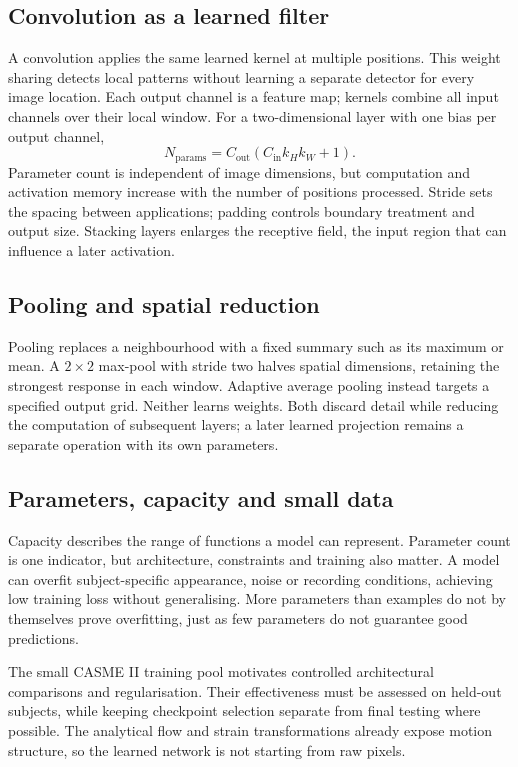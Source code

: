 \subsection{Convolution as a learned filter}
\label{sec:convolution}

A convolution applies the same learned kernel at multiple positions. This weight sharing detects local patterns without learning a separate detector for every image location. Each output channel is a feature map; kernels combine all input channels over their local window. For a two-dimensional layer with one bias per output channel,
\[
    N_{\mathrm{params}}=C_{\mathrm{out}}
       (C_{\mathrm{in}}k_Hk_W+1).
\]
Parameter count is independent of image dimensions, but computation and activation memory increase with the number of positions processed. Stride sets the spacing between applications; padding controls boundary treatment and output size. Stacking layers enlarges the receptive field, the input region that can influence a later activation.

\subsection{Pooling and spatial reduction}
\label{sec:pooling}

Pooling replaces a neighbourhood with a fixed summary such as its maximum or mean. A $2\times2$ max-pool with stride two halves spatial dimensions, retaining the strongest response in each window. Adaptive average pooling instead targets a specified output grid. Neither learns weights. Both discard detail while reducing the computation of subsequent layers; a later learned projection remains a separate operation with its own parameters.

\subsection{Parameters, capacity and small data}
\label{sec:capacity}

Capacity describes the range of functions a model can represent. Parameter count is one indicator, but architecture, constraints and training also matter. A model can overfit subject-specific appearance, noise or recording conditions, achieving low training loss without generalising. More parameters than examples do not by themselves prove overfitting, just as few parameters do not guarantee good predictions.

The small CASME II training pool motivates controlled architectural comparisons and regularisation. Their effectiveness must be assessed on held-out subjects, while keeping checkpoint selection separate from final testing where possible. The analytical flow and strain transformations already expose motion structure, so the learned network is not starting from raw pixels.
